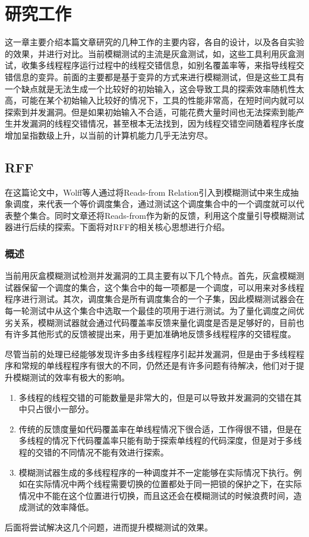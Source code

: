 
\section{研究工作}
这一章主要介绍本篇文章\cite{wolff2024greybox}研究的几种工作的主要内容，各自的设计，以及各自实验的效果，并进行对比。当前模糊测试的主流是灰盒测试，如\cite{jeong2019razzer}，这些工具利用灰盒测试，收集多线程程序运行过程中的线程交错信息，如别名覆盖率\cite{xu2020krace}等，来指导线程交错信息的变异。前面的主要都是基于变异的方式来进行模糊测试，但是这些工具有一个缺点就是无法生成一个比较好的初始输入，这会导致工具的探索效率随机性太高，可能在某个初始输入比较好的情况下，工具的性能非常高，在短时间内就可以探索到并发漏洞。但是如果初始输入不合适，可能花费大量时间也无法探索到能产生并发漏洞的线程交错情况，甚至根本无法找到，因为线程交错空间随着程序长度增加呈指数级上升，以当前的计算机能力几乎无法穷尽。

\subsection{RFF}

在这篇论文中，Wolff\cite{wolff2024greybox}等人通过将Reads-from Relation引入到模糊测试中来生成抽象调度，来代表一个等价调度集合，通过测试这个调度集合中的一个调度就可以代表整个集合。同时文章还将Reads-from作为新的反馈，利用这个度量引导模糊测试器进行后续的探索。下面将对RFF的相关核心思想进行介绍。

\subsubsection{概述}

当前用灰盒模糊测试检测并发漏洞的工具主要有以下几个特点。首先，灰盒模糊测试器保留一个调度的集合，这个集合中的每一项都是一个调度，可以用来对多线程程序进行测试。其次，调度集合是所有调度集合的一个子集，因此模糊测试器会在每一轮测试中从这个集合中选取一个最佳的项用于进行测试。为了量化调度之间优劣关系，模糊测试器就会通过代码覆盖率反馈来量化调度是否是足够好的，目前也有许多其他形式的反馈被提出来，用于更加准确地反馈多线程程序的交错程度。

尽管当前的处理已经能够发现许多由多线程程序引起并发漏洞，但是由于多线程程序和常规的单线程程序有很大的不同，仍然还是有许多问题有待解决，他们对于提升模糊测试的效率有极大的影响。
\begin{enumerate}
\item 多线程的线程交错的可能数量是非常大的，但是可以导致并发漏洞的交错在其中只占很小一部分。
\item 传统的反馈度量如代码覆盖率在单线程情况下很合适，工作得很不错，但是在多线程的情况下代码覆盖率只能有助于探索单线程的代码深度，但是对于多线程的交错的不同情况不能有效进行探索。
\item 模糊测试器生成的多线程程序的一种调度并不一定能够在实际情况下执行。例如在实际情况中两个线程需要切换的位置都处于同一把锁的保护之下，在实际情况中不能在这个位置进行切换，而且这还会在模糊测试的时候浪费时间，造成测试的效率降低。
\end{enumerate}
后面将尝试解决这几个问题，进而提升模糊测试的效果。

